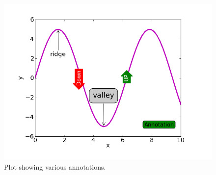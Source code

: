 \documentclass[10pt]{book}
\begin{document}
{\beforefig
\begin{figure}[h!]
  \centering
    \includegraphics[scale=0.5]{images/annotate.png}
  \caption{Plot showing various annotations.}
   \label{fig:annotate}
\end{figure}
\afterfig

}
\end{document}
